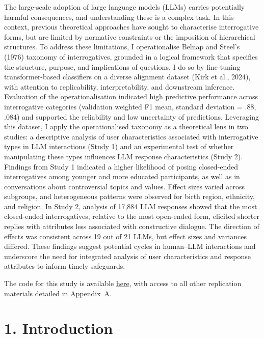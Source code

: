 \documentclass[
  12pt,
]{article}
\begin{document}
The large-scale adoption of large language models (LLMs) carries potentially harmful consequences, and understanding these is a complex task. In this context, previous theoretical approaches have sought to characterise interrogative forms, but are limited by normative constraints or the imposition of hierarchical structures. To address these limitations, I operationalise Belnap and Steel's (1976) taxonomy of interrogatives, grounded in a logical framework that specifies the structure, purpose, and implications of questions. I do so by fine-tuning transformer-based classifiers on a diverse alignment dataset (Kirk et al., 2024), with attention to replicability, interpretability, and downstream inference. Evaluation of the operationalisation indicated high predictive performance across interrogative categories (validation weighted F1 mean, standard deviation = .88, .084) and supported the reliability and low uncertainty of predictions. Leveraging this dataset, I apply the operationalised taxonomy as a theoretical lens in two studies: a descriptive analysis of user characteristics associated with interrogative types in LLM interactions (Study 1) and an experimental test of whether manipulating these types influences LLM response characteristics (Study 2). Findings from Study 1 indicated a higher likelihood of posing closed-ended interrogatives among younger and more educated participants, as well as in conversations about controversial topics and values. Effect sizes varied across subgroups, and heterogeneous patterns were observed for birth region, ethnicity, and religion. In Study 2, analysis of 17,884 LLM responses showed that the most closed-ended interrogatives, relative to the most open-ended form, elicited shorter replies with attributes less associated with constructive dialogue. The direction of effects was consistent across 19 out of 21 LLMs, but effect sizes and variances differed. These findings suggest potential cycles in human--LLM interactions and underscore the need for integrated analysis of user characteristics and response attributes to inform timely safeguards.

\begin{center}
The code for this study is available \href{https://github.com/50280/MY498-ASDS}{here}, with access to all other replication materials detailed in Appendix~A.
\end{center}

\clearpage

\section{1. Introduction}\label{introduction}
\end{document}
